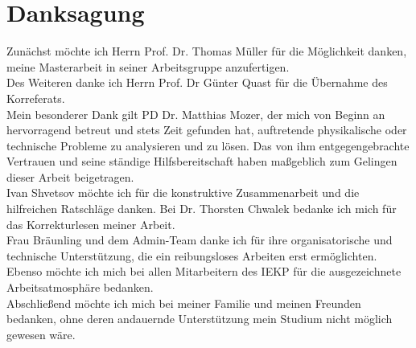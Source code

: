 \chapter*{Danksagung}
Zun\"achst m\"ochte ich Herrn Prof. Dr. Thomas M\"uller f\"ur die M\"oglichkeit danken, meine Masterarbeit in seiner Arbeitsgruppe anzufertigen.\\

Des Weiteren danke ich Herrn Prof. Dr G\"unter Quast f\"ur die \"Ubernahme des Korreferats.\\

Mein besonderer Dank gilt PD Dr. Matthias Mozer, der mich von Beginn an hervorragend betreut und stets Zeit gefunden hat, auftretende physikalische oder technische Probleme zu analysieren und zu l\"osen. Das von ihm entgegengebrachte Vertrauen und seine st\"andige Hilfsbereitschaft haben maßgeblich zum Gelingen dieser Arbeit beigetragen. \\

Ivan Shvetsov m\"ochte ich f\"ur die konstruktive Zusammenarbeit und die hilfreichen Ratschl\"age danken. Bei Dr. Thorsten Chwalek bedanke ich mich f\"ur das Korrekturlesen meiner Arbeit.\\


Frau Br\"aunling und dem Admin-Team danke ich f\"ur ihre organisatorische und technische Unterst\"utzung, die ein reibungsloses Arbeiten erst erm\"oglichten. Eben\-so m\"ochte ich mich bei allen Mitarbeitern des IEKP f\"ur die ausgezeichnete Arbeitsatmosph\"are bedanken.\\

Abschließend m\"ochte ich mich bei meiner Familie und meinen Freunden bedanken, ohne deren andauernde Unterst\"utzung mein Studium nicht m\"oglich gewesen w\"are.
